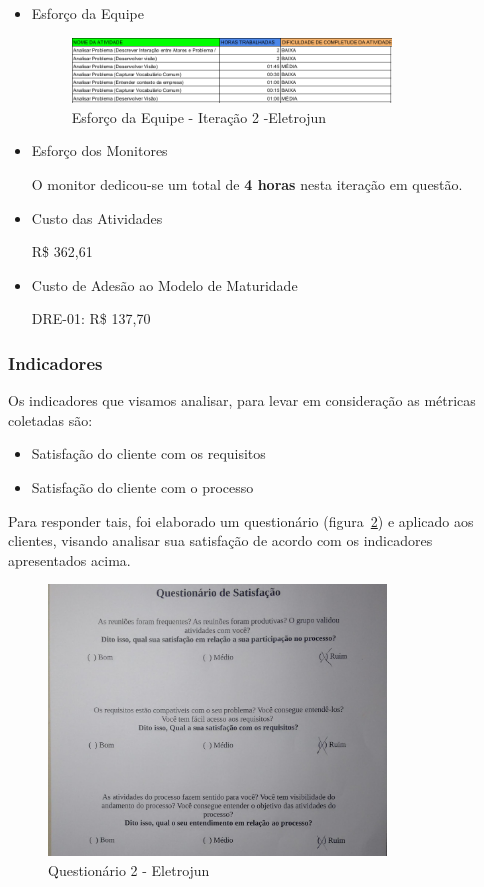 \begin{itemize}
\item Esforço da Equipe

\begin{figure}[H]
    \center
    \includegraphics[width=0.8\textwidth]{figuras/esforco-eqp4}
    \caption{Esforço da Equipe - Iteração 2 -Eletrojun}
    \label{fig:esforco-eqp4}
\end{figure}

\item Esforço dos Monitores

O monitor dedicou-se um total de \textbf{4 horas} nesta iteração em questão.

\item Custo das Atividades

R\$ 362,61

\item Custo de Adesão ao Modelo de Maturidade

DRE-01: R\$ 137,70

\end{itemize}

\subsubsection{Indicadores}

Os indicadores que visamos analisar, para levar em consideração as métricas coletadas são:
\begin{itemize}
\item Satisfação do cliente com os requisitos
\item Satisfação do cliente com o processo
\end{itemize}

Para responder tais, foi elaborado um questionário (figura~\ref{fig:quest4}) e aplicado aos clientes, visando analisar sua satisfação de acordo com os indicadores apresentados acima.

\begin{figure}[H]
  \center
  \includegraphics[width=0.8\textwidth]{figuras/quest4}
  \caption{Questionário 2 - Eletrojun}
  \label{fig:quest4}
\end{figure}


